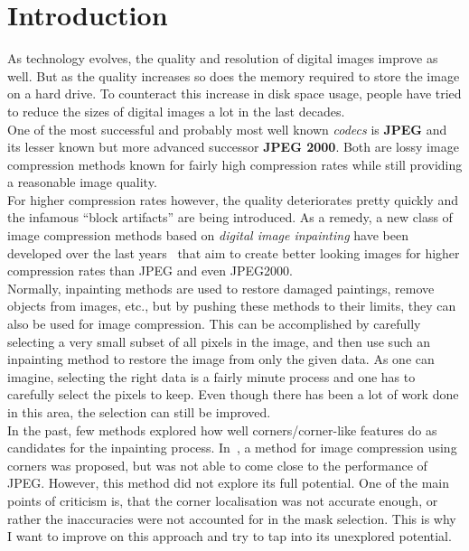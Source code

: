 \chapter{Introduction}\label{ch:Intro}
As technology evolves, the quality and resolution of digital images improve as well. But as the
quality increases so does the memory required to store the image on a hard drive. To counteract
this increase in disk space usage, people have tried to reduce the sizes of digital images a lot in the
last decades.\\
One of the most successful and probably most well known \textit{codecs}
is \textbf{JPEG}\cite{wallace91} and its lesser known but more advanced successor \textbf{JPEG 2000}\cite{jpeg2000}. Both are lossy image compression methods
known for fairly high compression rates while still providing a reasonable image quality.\\
For
higher compression rates however, the quality deteriorates pretty quickly and the infamous ``block
artifacts'' are being introduced. As a remedy, a new class of image compression methods based on
\textit{digital image inpainting} have been developed over the last
years~\cite{galic05, galic08, mainberger12, peloquin09, zimmer07, mainberger09, mainberger10, dong07, schmaltz09} that
aim to create better looking images for higher compression rates than JPEG and even JPEG2000. \\
Normally, inpainting methods are used to restore damaged paintings, remove objects from images,
etc., but by pushing these methods to their limits, they can also be used for image compression.
This can be accomplished by carefully selecting a very small subset of all pixels in the image, 
and then use such an inpainting method to restore the image from only the given data.
As one can imagine, selecting the right data is a fairly minute process and one has to carefully
select the pixels to keep. Even though there has been a lot of work done in this
area\cite{belhachmi09, schmaltz14, hoeltgen12}, the
selection can still be improved.\\
In the past, few methods explored how well corners/corner-like features do as candidates for
the inpainting process. In~\cite{zimmer07}, a method for image compression using corners was
proposed, but was not able to come close to the performance of JPEG. However, this method did not
explore its full potential. One of the main points of criticism is, that the corner localisation
was not accurate enough, or rather the inaccuracies were not accounted for in the mask
selection\cite{conversation}. This is why I want to improve on this approach and try to tap into
its unexplored potential.\\

